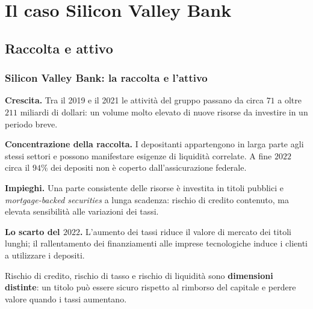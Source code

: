 \section{Il caso Silicon Valley Bank}



\subsection{Raccolta e attivo}%

\begin{frame}%
%

\frametitle{Silicon Valley Bank: la raccolta e l'attivo}%
%

%


\begin{stepitemize}


\item \textbf{Crescita.} Tra il 2019 e il 2021 le attivit\`{a} del gruppo
passano da circa $71$ a oltre $211$ miliardi di dollari: un volume molto
elevato di nuove risorse da investire in un periodo breve.

\item \textbf{Concentrazione della raccolta.} I depositanti appartengono in
larga parte agli stessi settori e possono manifestare esigenze di
liquidit\`{a} correlate. A fine $2022$ circa il $94\%$ dei depositi non \`{e}
coperto dall'assicurazione federale.

\item \textbf{Impieghi.} Una parte consistente delle risorse \`{e} investita
in titoli pubblici e \emph{mortgage-backed securities} a lunga scadenza:
rischio di credito contenuto, ma elevata sensibilit\`{a} alle variazioni dei tassi.

\item \textbf{Lo scarto del $2022$.} L'aumento dei tassi riduce il valore di
mercato dei titoli lunghi; il rallentamento dei finanziamenti alle imprese
tecnologiche induce i clienti a utilizzare i depositi.
\end{stepitemize}

\medskip

\begin{center}
{\small Rischio di credito, rischio di tasso e rischio di liquidit\`{a} sono
\textbf{dimensioni distinte}: un titolo pu\`{o} essere sicuro rispetto al
rimborso del capitale e perdere valore quando i tassi aumentano.}
\end{center}

%

\transboxout
\end{frame}%


